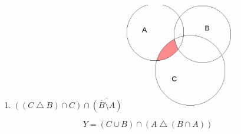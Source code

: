 \documentclass{article}
\begin{document}
\begin{enumerate}
    \item $((C \bigtriangleup B) \cap C) \cap \overline{(\overline{B} \setminus A)}$
    \includegraphics[width=50mm]{20.png}
\end{enumerate}


\noindent\makebox[\linewidth]{\rule{\paperwidth}{0.4pt}}
$$Y = (C \cup B) \cap (A \bigtriangleup (B \cap A))$$
\end{document}
